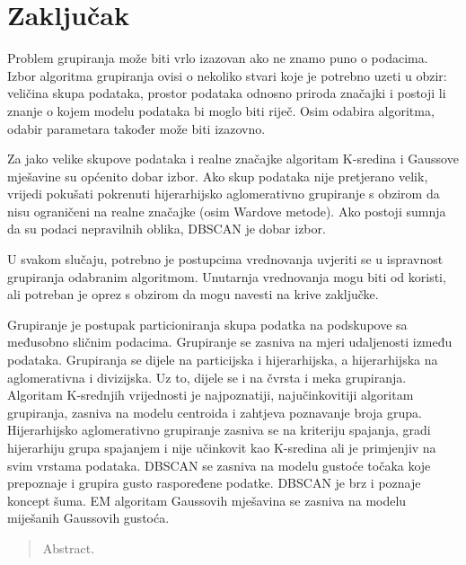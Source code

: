 \documentclass[times, utf8, zavrsni]{fer}
\begin{document}
\chapter{Zaključak}
\label{chap:conclusion}
Problem grupiranja može biti vrlo izazovan ako ne znamo puno o podacima. Izbor algoritma grupiranja ovisi o nekoliko stvari koje je potrebno uzeti u obzir: veličina skupa podataka, prostor podataka odnosno priroda značajki i postoji li znanje o kojem modelu podataka bi moglo biti riječ. Osim odabira algoritma, odabir parametara također može biti izazovno.

Za jako velike skupove podataka i realne značajke algoritam K-sredina i Gaussove mješavine su općenito dobar izbor. Ako skup podataka nije pretjerano velik, vrijedi pokušati pokrenuti hijerarhijsko aglomerativno grupiranje s obzirom da nisu ograničeni na realne značajke (osim Wardove metode). Ako postoji sumnja da su podaci nepravilnih oblika, DBSCAN je dobar izbor.

U svakom slučaju, potrebno je postupcima vrednovanja uvjeriti se u ispravnost grupiranja odabranim algoritmom. Unutarnja vrednovanja mogu biti od koristi, ali potreban je oprez s obzirom da mogu navesti na krive zaključke.




\begin{sazetak}
Grupiranje je postupak particioniranja skupa podatka na podskupove sa međusobno sličnim podacima. Grupiranje se zasniva na mjeri udaljenosti između podataka. Grupiranja se dijele na particijska i hijerarhijska, a hijerarhijska na aglomerativna i divizijska. Uz to, dijele se i na čvrsta i meka grupiranja. Algoritam K-srednjih vrijednosti je najpoznatiji, najučinkovitiji algoritam grupiranja, zasniva na modelu centroida i zahtjeva poznavanje broja grupa. Hijerarhijsko aglomerativno grupiranje zasniva se na kriteriju spajanja, gradi hijerarhiju grupa spajanjem i nije učinkovit kao K-sredina ali je primjenjiv na svim vrstama podataka. DBSCAN se zasniva na modelu gustoće točaka koje prepoznaje i grupira gusto raspoređene podatke. DBSCAN je brz i poznaje koncept šuma. EM algoritam Gaussovih mješavina se zasniva na modelu miješanih Gaussovih gustoća.  

\end{sazetak}
\begin{abstract}
Abstract.

\end{abstract}
\end{document}
